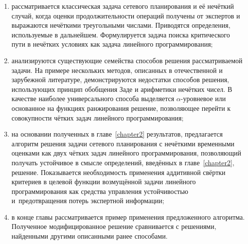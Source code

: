 \begin{enumerate}
  \item рассматривается классическая задача сетевого планирования и её нечёткий случай, когда оценки продолжительности операций получены от экспертов и выражаются нечёткими треугольными числами. Приводятся определения, используемые в дальнейшем. Формулируется задача поиска критического пути в нечётких условиях как задача линейного программирования;
  \item анализируются существующие семейства способов решения рассматриваемой задачи. На примере нескольких методов, описанных в отечественной и зарубежной литературе, демонстрируются недостатки способов решения, использующих принцип обобщения Заде и арифметики нечётких чисел. В качестве наиболее универсального способа выделяется $\alpha$-уровневое или основанное на функциях ранжирования решение, позволяющее перейти к совокупности чётких задач линейного программирования;
  \item на основании полученных в главе~\ref{chapter2} результатов, предлагается алгоритм решения задачи сетевого планирования с нечёткими временными оценками как двух чётких задач линейного программирования, позволяющий получать устойчивое в смысле определений, введённых в главе~\ref{chapter2}, решение. Показывается необходимость применения аддитивной свёртки критериев в целевой функции возмущённой задачи линейного программирования как средства управления устойчивостью и~предотвращения потерь экспертной информации;
  \item в конце главы рассматривается пример применения предложенного алгоритма. Полученное модифицированное решение сравнивается с решениями, найденными другими описанными ранее способами.
\end{enumerate}